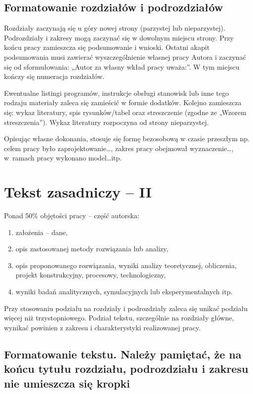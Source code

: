\documentclass[12pt,twoside]{article}
\begin{document}
\subsection{Formatowanie rozdziałów i podrozdziałów}
Rozdziały zaczynają się u góry nowej strony (parzystej lub nieparzystej). Podrozdziały i zakresy mogą zaczynać się w dowolnym miejscu strony. Przy końcu pracy zamieszcza się podsumowanie i wnioski. Ostatni akapit podsumowania musi zawierać wyszczególnienie własnej pracy Autora i zaczynać się od sformułowania: „Autor za własny wkład pracy uważa:”. W tym miejscu kończy się numeracja rozdziałów.

Ewentualne listingi programów, instrukcje obsługi stanowisk lub inne tego rodzaju materiały zaleca się zamieścić w formie dodatków. Kolejno zamieszcza się: wykaz literatury, spis rysunków/tabel oraz streszczenie (zgodne ze „Wzorem streszczenia”). Wykaz literatury rozpoczyna od strony nieparzystej.

Opisując własne dokonania, stosuje się formę bezosobową w czasie przeszłym np. celem pracy było zaprojektowanie\ldots, zakres pracy obejmował wyznaczenie\ldots, w~ramach pracy wykonano model\ldots itp.
\clearpage	

\section{Tekst zasadniczy -- II}

Ponad 50\% objętości pracy -- część autorska:
\begin{enumerate}[label=\alph*), leftmargin=1.25cm] 
	\item założenia – dane,
	\item opis zastosowanej metody rozwiązania lub analizy,
	\item opis proponowanego rozwiązania, wyniki analizy teoretycznej, obliczenia, projekt konstrukcyjny, procesowy, technologiczny,
	\item wyniki badań analitycznych, symulacyjnych lub eksperymentalnych itp.
\end{enumerate}

Przy stosowaniu podziału na rozdziały i podrozdziały zaleca się unikać podziału więcej niż trzystopniowego. Podział tekstu, szczególnie na rozdziały główne, wynikać powinien z zakresu i charakterystyki realizowanej pracy.

\subsection{Formatowanie tekstu. Należy pamiętać, że na końcu tytułu rozdziału, podrozdziału i zakresu nie umieszcza się kropki}
\end{document}
